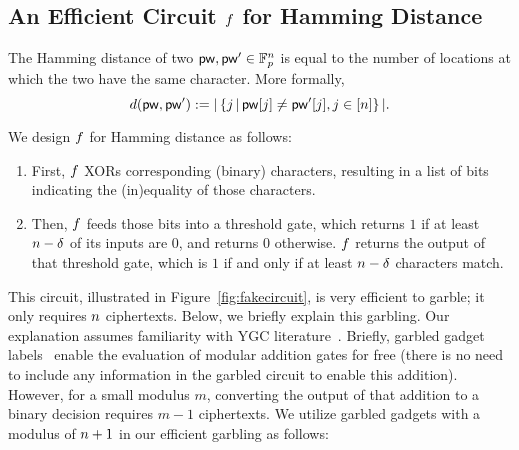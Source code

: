 
\subsection{An Efficient Circuit $f$ for Hamming Distance}
\label{sec:efficientf}

The Hamming distance of two \passwords $\mathsf{pw}, \mathsf{pw}' \in\mathbb{F}_{p}^{n}$ is equal to the number of locations at which the two \passwords have the same character. 
More formally,
\[d(\mathsf{pw},\mathsf{pw}'):=|\left\{j\,|\,\mathsf{pw}[j]\neq\mathsf{pw}'[j], j\in[n]\right\}|.\]

We design $f$ for Hamming distance as follows:
\begin{enumerate}
\item
First, $f$ XORs corresponding (binary) \password characters, resulting in a list of bits indicating the (in)equality of those characters.
\item
Then, $f$ feeds those bits into a threshold gate, which returns $1$ if at least $n - \delta$ of its inputs are $0$, and returns $0$ otherwise.
$f$ returns the output of that threshold gate, which is $1$ if and only if at least $n - \delta$ \password characters match.
\end{enumerate}

This circuit, illustrated in Figure~\ref{fig:fakecircuit}, is very efficient to garble; it only requires $n$ ciphertexts.
Below, we briefly explain this garbling.
Our explanation assumes familiarity with YGC literature~\cite[and references therein]{YGCintro}.
Briefly, garbled gadget labels~\cite{CCS:BalMalRos16} enable the evaluation of modular addition gates for free (there is no need to include any information in the garbled circuit to enable this addition).
However, for a small modulus $m$, converting the output of that addition to a binary decision requires $m-1$ ciphertexts.
We utilize garbled gadgets with a modulus of $n + 1$ in our efficient garbling as follows:

